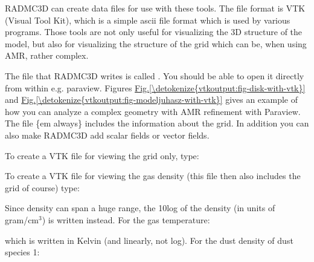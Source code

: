 \documentclass[letterpaper,10pt,english]{sphinxmanual}
\begin{document}
RADMC\sphinxhyphen{}3D can create data files for use with these tools. The file format is
VTK (Visual Tool Kit), which is a simple ascii file format which is used by
various programs. Those tools are not only useful for visualizing the
3\sphinxhyphen{}D structure of the model, but also for visualizing the structure of the
grid which can be, when using AMR, rather complex.

The file that RADMC\sphinxhyphen{}3D writes is called . You should be able to
open it directly from within e.g. paraview. Figures \hyperref[\detokenize{vtkoutput:fig-disk-with-vtk}]{Fig.\@ \ref{\detokenize{vtkoutput:fig-disk-with-vtk}}}
and \hyperref[\detokenize{vtkoutput:fig-modeljuhasz-with-vtk}]{Fig.\@ \ref{\detokenize{vtkoutput:fig-modeljuhasz-with-vtk}}} gives an example of how you can analyze a
complex geometry with AMR refinement with Paraview. The file \{em always\}
includes the information about the grid. In addition you can also make RADMC\sphinxhyphen{}3D
add scalar fields or vector fields.

To create a VTK file for viewing the grid only, type:

\begin{sphinxVerbatim}[commandchars=\\\{\}]
 
\end{sphinxVerbatim}

To create a VTK file for viewing the gas density (this file then also
includes the grid of course) type:

\begin{sphinxVerbatim}[commandchars=\\\{\}]
 
\end{sphinxVerbatim}

Since density can span a huge range, the 10\sphinxhyphen{}log of the density (in units of
gram/cm\(^3\)) is written instead. For the gas temperature:

\begin{sphinxVerbatim}[commandchars=\\\{\}]
 
\end{sphinxVerbatim}

which is written in Kelvin (and linearly, not log). For the dust density of
dust species 1:

\begin{sphinxVerbatim}[commandchars=\\\{\}]
  
\end{sphinxVerbatim}
\end{document}
